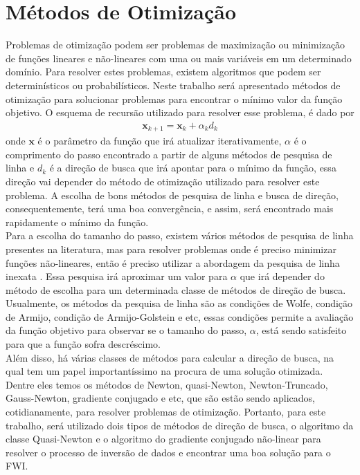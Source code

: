 \section{Métodos de Otimização}

Problemas de otimização podem ser problemas de maximização ou minimização de funções lineares e não-lineares com uma ou mais variáveis em um determinado domínio. Para resolver estes problemas, existem algoritmos que podem ser determinísticos ou probabilísticos. Neste trabalho será apresentado métodos de otimização para solucionar problemas para encontrar o mínimo valor da função objetivo. O esquema de recursão utilizado para resolver esse problema, é dado por
\begin{eqnarray}
\label{xk}
             \mathbf{x}_{k+1} = \mathbf{x}_{k} + \alpha_{k} d_{k} 
\end{eqnarray}
onde $\mathbf{x}$ é o parâmetro da função que irá atualizar iterativamente, $\alpha$ é o comprimento do passo encontrado a partir de alguns métodos de pesquisa de linha e $d_{k}$ é a direção de busca que irá apontar para o mínimo da função, essa direção vai depender do método de otimização utilizado para resolver este problema. A escolha de bons métodos de pesquisa de linha e busca de direção, consequentemente, terá uma boa convergência, e assim, será encontrado mais rapidamente o mínimo da função. \\
 
Para a escolha do tamanho do passo, existem vários métodos de pesquisa de linha presentes na literatura, mas para resolver problemas onde é preciso minimizar funções não-lineares, então é preciso utilizar a abordagem da pesquisa de linha inexata \citep{nocedal_2006}. Essa pesquisa irá aproximar um valor para $\alpha$ que irá depender do método de escolha para um determinada classe de métodos de direção de busca. Usualmente, os métodos da pesquisa de linha são as condições de Wolfe, condição de Armijo, condição de Armijo-Golstein e etc, essas condições permite a avaliação da função objetivo para observar se o tamanho do passo, $\alpha$, está sendo satisfeito para que a função sofra descréscimo. \\

Além disso, há várias classes de métodos para calcular a direção de busca, na qual tem um papel importantíssimo na procura de uma solução otimizada. Dentre eles temos os métodos de Newton, quasi-Newton, Newton-Truncado, Gauss-Newton, gradiente conjugado e etc, que são estão sendo aplicados, cotidianamente, para resolver problemas de otimização. Portanto, para este trabalho, será utilizado dois tipos de métodos de direção de busca, o algoritmo da classe Quasi-Newton e o algoritmo do gradiente conjugado não-linear para resolver o processo de inversão de dados e encontrar uma boa solução para o FWI.   



